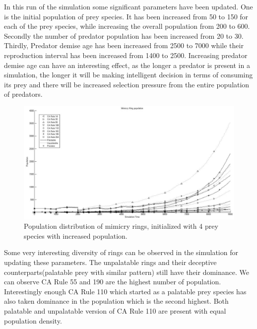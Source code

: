 
In this run of the simulation some significant parameters have been updated. One is the initial population of prey species. It has been increased from 50 to 150 for each of the prey species, while increasing the overall population from 200 to 600. Secondly the number of predator population has been increased from 20 to 30. Thirdly, Predator demise age has been increased from 2500 to 7000 while their reproduction interval has been increased from 1400 to 2500. Increasing predator demise age can have an interesting effect, as the longer a predator is present in a simulation, the longer it will be making intelligent decision in terms of consuming its prey and there will be increased selection pressure from the entire population of predators. 

\begin{figure}[H]
	\centering
	\includegraphics[scale=0.40]{images/simTime9K-4MorePrey}
	\caption{Population distribution of mimicry rings, initialized with 4 prey species with increased population.}
	\label{fig:plot-4-more-prey}
\end{figure}

Some very interesting diversity of rings can be observed in the simulation for updating these parameters. The unpalatable rings and their deceptive counterparts(palatable prey with similar pattern) still have their dominance. We can observe CA Rule 55 and 190 are the highest number of population. Interestingly enough CA Rule 110 which started as a palatable prey species has also taken dominance in the population which is the second highest. Both palatable and unpalatable version of CA Rule 110 are present with equal population density.

